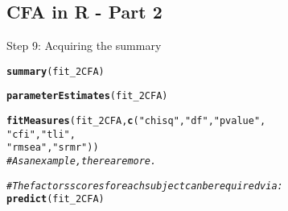 \documentclass[10pt]{beamer}\usepackage[]{graphicx}\usepackage[]{xcolor}
\makeatletter
\newcommand{\hlsng}[1]{\textcolor[rgb]{0.192,0.494,0.8}{#1}}%
\newcommand{\hlcom}[1]{\textcolor[rgb]{0.678,0.584,0.686}{\textit{#1}}}%
\newcommand{\hldef}[1]{\textcolor[rgb]{0.345,0.345,0.345}{#1}}%
\newcommand{\hlkwd}[1]{\textcolor[rgb]{0.737,0.353,0.396}{\textbf{#1}}}%
\newenvironment{kframe}{%
 \def\at@end@of@kframe{}%
 \ifinner\ifhmode%
  \def\at@end@of@kframe{\end{minipage}}%
  \begin{minipage}{\columnwidth}%
 \fi\fi%
 \def\FrameCommand##1{\hskip\@totalleftmargin \hskip-\fboxsep
 \colorbox{shadecolor}{##1}\hskip-\fboxsep
     \hskip-\linewidth \hskip-\@totalleftmargin \hskip\columnwidth}%
 \MakeFramed {\advance\hsize-\width
   \@totalleftmargin\z@ \linewidth\hsize
   \@setminipage}}%
 {\par\unskip\endMakeFramed%
 \at@end@of@kframe}
\newenvironment{knitrout}{}{} %
\makeatother
\begin{document}
\subsection*{CFA in R - Part 2}
%
\begin{frame}[fragile]{Step 9: Acquiring the summary}

\begin{knitrout}
\color{fgcolor}\begin{kframe}
\begin{alltt}
\hlkwd{summary}\hldef{(fit_2CFA)}

\hlkwd{parameterEstimates}\hldef{(fit_2CFA)}

\hlkwd{fitMeasures}\hldef{(fit_2CFA,} \hlkwd{c}\hldef{(}\hlsng{"chisq"}\hldef{,} \hlsng{"df"}\hldef{,} \hlsng{"pvalue"}\hldef{,}
                        \hlsng{"cfi"}\hldef{,} \hlsng{"tli"}\hldef{,}
                        \hlsng{"rmsea"}\hldef{,}\hlsng{"srmr"}\hldef{))}
\hlcom{# As an example, there are more.}
\end{alltt}
\end{kframe}
\end{knitrout}

\begin{knitrout}
\color{fgcolor}\begin{kframe}
\begin{alltt}
\hlcom{#The factors scores for each subject can be required via:}
\hlkwd{predict}\hldef{(fit_2CFA)}
\end{alltt}
\end{kframe}
\end{knitrout}

\end{frame}
%
\end{document}
